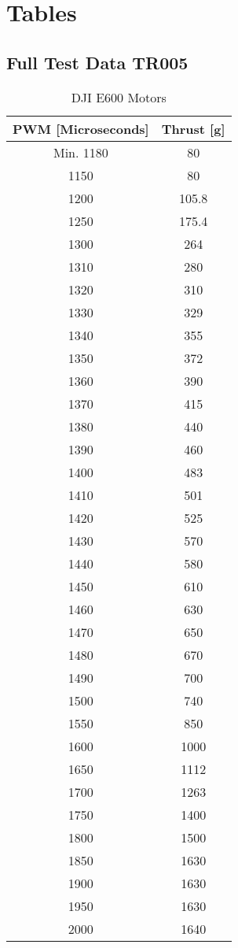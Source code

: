 \chapter{Tables}
\label{app:tables}

\section{Full Test Data TR005}
\label{app:tr005}

\begin {table}[H]
    \begin{center}
    \caption {DJI E600 Motors} 
    \label{tab:tabt1} 
    \begin{tabular}{|c|c|}\hline 
\textbf{PWM [Microseconds]} & \textbf{Thrust [g]}\\
\hline 
Min. 1180 & 80 \\
1150 & 80 \\
1200 & 105.8 \\
1250 & 175.4 \\
1300 & 264 \\
1310 & 280 \\
1320 & 310 \\
1330 & 329 \\
1340 & 355 \\
1350 & 372 \\
1360 & 390 \\
1370 & 415 \\
1380 & 440 \\
1390 & 460 \\
1400 & 483 \\
1410 & 501 \\
1420 & 525 \\
1430 & 570 \\
1440 & 580 \\
1450 & 610 \\
1460 & 630 \\
1470 & 650 \\
1480 & 670 \\
1490 & 700 \\
1500 & 740 \\
1550 & 850 \\
1600 & 1000 \\
1650 & 1112 \\
1700 & 1263 \\
1750 & 1400 \\
1800 & 1500 \\
1850 & 1630 \\
1900 & 1630 \\
1950 & 1630 \\
2000 & 1640 \\

        \hline 
    \end{tabular}
    \end{center}
\end{table}
